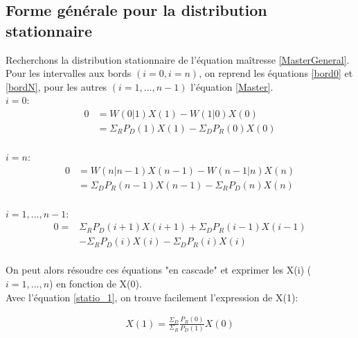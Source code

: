 \subsection{Forme générale pour la distribution stationnaire}
Recherchons la distribution stationnaire de l'équation maîtresse \ref{MasterGeneral}.\\

Pour les intervalles aux bords $(i=0,i=n)$, on reprend les équations \ref{bord0} et \ref{bordN}, pour les autres $(i=1,...,n-1)$ l'équation \ref{Master}.\\

$i=0$:
\begin{equation}
\begin{aligned}
0 &= W(0|1) X(1) - W(1|0) X(0)\\
  &= \Sigma_R P_D(1) X(1)- \Sigma_D P_R(0) X(0)\\
\label{statio_1}
\end{aligned}
\end{equation}

$i=n$:
\begin{equation}
\begin{aligned}
0 &= W(n|n-1) X(n-1) - W(n-1|n) X(n)\\
  &= \Sigma_D P_R(n-1)X(n-1)- \Sigma_R P_D(n) X(n)\\
 \label{statio_N}
\end{aligned}
\end{equation}

$i=1,...,n-1$:
\begin{equation}
\begin{aligned}
0 =& \Sigma_R P_D(i+1) X(i+1)+ \Sigma_D P_R(i-1) X(i-1)\\ 
	&- \Sigma_R P_D(i) X(i) - \Sigma_D P_R(i) X(i)\\
\label{statio_i}
\end{aligned}
\end{equation}

On peut alors résoudre ces équations "en cascade" et exprimer les X(i) ($i=1,...,n$) en fonction de X(0).\\
Avec l'équation \ref{statio_1}, on trouve facilement l'expression de X(1):

\begin{equation}
\begin{aligned}
X(1) = \frac{\Sigma_D}{\Sigma_R} \frac{P_R(0)}{P_D(1)} X(0)
\end{aligned}
\end{equation}

